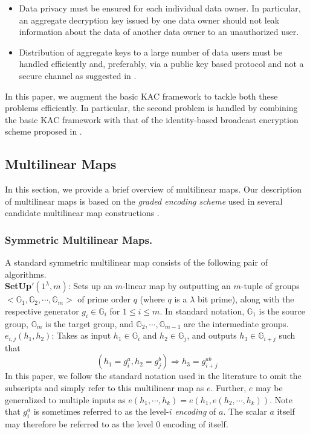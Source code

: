 \begin{itemize}
 \item Data privacy must be ensured for each individual data owner. In particular, an aggregate decryption key issued by one data owner should not leak information about the data of another data owner to an unauthorized user.
 \item Distribution of aggregate keys to a large number of data users must be handled efficiently and, preferably, via a public key based protocol and not a secure channel as suggested in \cite{chu2014key}.
\end{itemize}

\noindent In this paper, we augment the basic KAC framework to tackle both these problems efficiently. In particular, the second problem is handled by combining the basic KAC framework with that of the identity-based broadcast encryption scheme proposed in \cite{boneh2014low}. 

\subsection{Multilinear Maps}
\label{subsec:multilinear}

In this section, we provide a brief overview of multilinear maps. Our description of multilinear maps is based on the \emph{graded encoding scheme} used in several candidate multilinear map constructions \cite{garg2013candidate}.

\subsubsection{Symmetric Multilinear Maps.} A standard symmetric multilinear map consists of the following pair of algorithms.\\

\noindent\textbf{SetUp}$'(1^\lambda,m)$: Sets up an $m$-linear map by outputting an $m$-tuple of groups $<\mathbb{G}_1,\mathbb{G}_2,\cdots,\mathbb{G}_m>$ of prime order $q$ (where $q$ is a $\lambda$ bit prime), along with the respective generator $g_i\in\mathbb{G}_i$ for $1\leq i\leq m$. In standard notation, $\mathbb{G}_1$ is the source group, $\mathbb{G}_m$ is the target group, and $\mathbb{G}_2,\cdots,\mathbb{G}_{m-1}$ are the intermediate groups.\\

\noindent$e_{i,j}(h_1,h_2)$: Takes as input $h_1\in\mathbb{G}_i$ and $h_2\in\mathbb{G}_j$, and outputs $h_3\in\mathbb{G}_{i+j}$ such that
\begin{equation}
 (h_1=g_i^a,h_2=g_j^b) \Rightarrow h_3=g_{i+j}^{ab}\nonumber
\end{equation}
\noindent In this paper, we follow the standard notation used in the literature to omit the subscripts and simply refer to this multilinear map as $e$. Further, $e$ may be generalized to multiple inputs as $e(h_1,\cdots,h_k)=e(h_1,e(h_2,\cdots,h_k))$. Note that $g^a_i$ is sometimes referred to as the level-$i$ \emph{encoding} of $a$. The scalar $a$ itself may therefore be referred to as the level $0$ encoding of itself.

